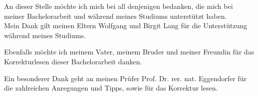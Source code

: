\label{cha:danksagung}
An dieser Stelle möchte ich mich bei all denjenigen bedanken, die mich bei meiner Bachelorarbeit und während meines Studiums unterstützt haben.\\
Mein Dank gilt meinen Eltern Wolfgang und Birgit Lang für die Unterstützung während meines Studiums. 

Ebenfalls möchte ich meinem Vater, meinem Bruder und meiner Freundin für das Korrekturlesen dieser Bachelorarbeit danken.

Ein besonderer Dank geht an meinen Prüfer Prof. Dr. rer. nat. Eggendorfer für die zahlreichen Anregungen und Tipps, sowie für das Korrektur lesen.




